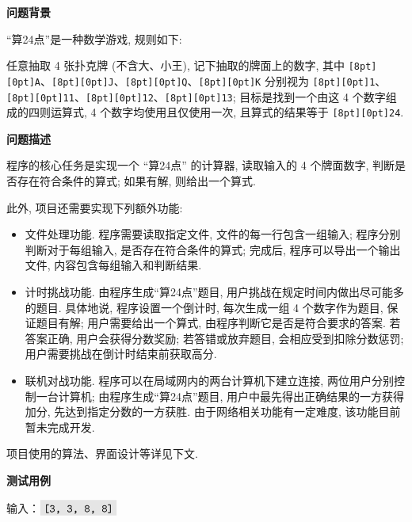 \documentclass{ctexart}
\newcommand{\subtitletext}[1]{{\fontsize{16}{16} \textbf{#1} \vspace*{1ex}}}
\newcommand{\codebox}[1]{\colorbox[rgb]{0.9, 0.9, 0.9}{\texttt{\raisebox{0pt}[8pt][0pt]{#1}}}}
\begin{document}
\setlength{\parskip}{1ex}
\setlength{\parindent}{0pt}
\renewcommand{\labelenumii}{(\arabic{enumii})}

\fontsize{12}{12}

\subtitletext{问题背景}

“算24点”是一种数学游戏, 规则如下:

任意抽取 4 张扑克牌 (不含大、小王), 记下抽取的牌面上的数字, 
其中 \codebox{A}、\codebox{J}、\codebox{Q}、\codebox{K} 分别视为 \codebox{1}、\codebox{11}、\codebox{12}、\codebox{13};
目标是找到一个由这 4 个数字组成的四则运算式, 4 个数字均使用且仅使用一次, 且算式的结果等于 \codebox{24}.

\vspace*{4ex}

\subtitletext{问题描述}

程序的核心任务是实现一个 “算24点” 的计算器, 读取输入的 4 个牌面数字, 判断是否存在符合条件的算式;
如果有解, 则给出一个算式.

此外, 项目还需要实现下列额外功能:

\begin{itemize}[label=*, itemindent=0pt, leftmargin=12pt]
    \item 文件处理功能. 程序需要读取指定文件, 文件的每一行包含一组输入; 
    程序分别判断对于每组输入, 是否存在符合条件的算式;
    完成后, 程序可以导出一个输出文件, 内容包含每组输入和判断结果.

    \item 计时挑战功能. 由程序生成“算24点”题目, 用户挑战在规定时间内做出尽可能多的题目.
    具体地说, 程序设置一个倒计时, 每次生成一组 4 个数字作为题目, 保证题目有解;
    用户需要给出一个算式, 由程序判断它是否是符合要求的答案.
    若答案正确, 用户会获得分数奖励; 若答错或放弃题目, 会相应受到扣除分数惩罚;
    用户需要挑战在倒计时结束前获取高分.

    \item 联机对战功能. 程序可以在局域网内的两台计算机下建立连接, 两位用户分别控制一台计算机;
    由程序生成“算24点”题目, 用户中最先得出正确结果的一方获得加分, 先达到指定分数的一方获胜.
    由于网络相关功能有一定难度, 该功能目前暂未完成开发.
    
\end{itemize}

项目使用的算法、界面设计等详见下文.

\vspace*{4ex}

\subtitletext{测试用例}

输入：$\codebox{[3, 3, 8, 8]}$
\end{document}
